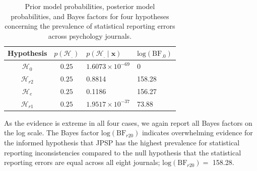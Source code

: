 \documentclass[
  english,
  man,floatsintext]{apa6}
\newenvironment{Shaded}{\begin{snugshade}}{\end{snugshade}}
\newcommand{\KeywordTok}[1]{\textcolor[rgb]{0.13,0.29,0.53}{\textbf{#1}}}
\newcommand{\NormalTok}[1]{#1}
\newcommand{\OperatorTok}[1]{\textcolor[rgb]{0.81,0.36,0.00}{\textbf{#1}}}
\newcommand{\StringTok}[1]{\textcolor[rgb]{0.31,0.60,0.02}{#1}}
\begin{document}
\begin{Shaded}
\end{Shaded}

\begin{table}[H]
    \centering
    \caption{Prior model probabilities, posterior model probabilities, and Bayes factors for four hypotheses concerning the prevalence of statistical reporting errors across psychology journals.}
    \begin{tabular}{ccll}
        \hline Hypothesis & $p(\mathcal{H}_{.})$ & $p(\mathcal{H}_{.} \mid \mathbf{x})$ & $\text{log}(\text{BF}_{.0})$ \\
        \hline
        $\mathcal{H}_{0}$  & $0.25$ & 
        $1.6073 \times 10^{-69}$ & 
        $0$ \\
        $\mathcal{H}_{r2}$ & $0.25$ & 
        0.8814 &  
        158.28\\
        $\mathcal{H}_{e}$  &  $0.25$  & 
        0.1186 & 
        156.27 \\
        $\mathcal{H}_{r1}$  &  $0.25$  & 
        $1.9517 \times 10^{-37}$ & 
        73.88 \\
        \hline
    \end{tabular}
    \label{Tab:journalsResults}
\end{table}

\noindent As the evidence is extreme in all four cases, we again report all Bayes factors on the log scale. The Bayes factor \(\text{log}(\text{BF}_{r20})\) indicates overwhelming evidence for the informed hypothesis that JPSP has the highest prevalence for statistical reporting inconsistencies compared to the null hypothesis that the statistical reporting errors are equal across all eight journals; \(\text{log}(\text{BF}_{r20}) =\) 158.28.
\end{document}
